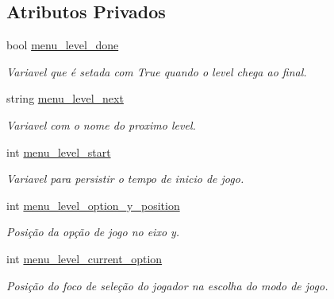 \subsection*{Atributos Privados}
\begin{DoxyCompactItemize}
\item 
\mbox{\label{classMenuLevel_a0736601eec1f2f2f9d11a863bcaf7fbb}} 
bool \mbox{\hyperlink{classMenuLevel_a0736601eec1f2f2f9d11a863bcaf7fbb}{menu\+\_\+level\+\_\+done}}
\begin{DoxyCompactList}\small\item\em Variavel que é setada com True quando o level chega ao final. \end{DoxyCompactList}\item 
\mbox{\label{classMenuLevel_a2e458acb753206af5fd7e4669eee427c}} 
string \mbox{\hyperlink{classMenuLevel_a2e458acb753206af5fd7e4669eee427c}{menu\+\_\+level\+\_\+next}}
\begin{DoxyCompactList}\small\item\em Variavel com o nome do proximo level. \end{DoxyCompactList}\item 
\mbox{\label{classMenuLevel_a29481a284b638c832504527c2318cf5a}} 
int \mbox{\hyperlink{classMenuLevel_a29481a284b638c832504527c2318cf5a}{menu\+\_\+level\+\_\+start}}
\begin{DoxyCompactList}\small\item\em Variavel para persistir o tempo de inicio de jogo. \end{DoxyCompactList}\item 
\mbox{\label{classMenuLevel_ae850b59099dcb3e69c8366b46a211dd7}} 
int \mbox{\hyperlink{classMenuLevel_ae850b59099dcb3e69c8366b46a211dd7}{menu\+\_\+level\+\_\+option\+\_\+y\+\_\+position}}
\begin{DoxyCompactList}\small\item\em Posição da opção de jogo no eixo y. \end{DoxyCompactList}\item 
\mbox{\label{classMenuLevel_a99536811d95ed1b23e29270f299c9d48}} 
int \mbox{\hyperlink{classMenuLevel_a99536811d95ed1b23e29270f299c9d48}{menu\+\_\+level\+\_\+current\+\_\+option}}
\begin{DoxyCompactList}\small\item\em Posição do foco de seleção do jogador na escolha do modo de jogo. \end{DoxyCompactList}\item 

\end{DoxyCompactItemize}
